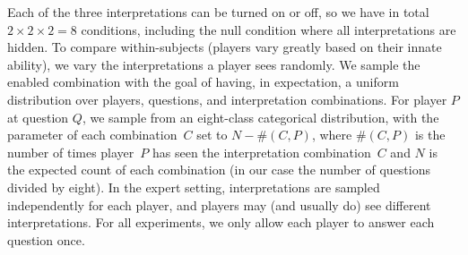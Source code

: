 Each of the three interpretations can be turned on or off, so we have
in total $2\times2\times2=8$ conditions, including the null condition
where all interpretations are hidden.
To compare within-subjects (players vary greatly based on their innate
ability), we vary the interpretations a player sees randomly.  We
sample the enabled combination with the goal of having, in
expectation, a uniform distribution over players, questions, and
interpretation combinations. For player $P$ at question $Q$, we sample
from an eight-class categorical distribution, with the parameter of
each combination~$C$ set to $N-\#(C, P)$, where $\#(C, P)$ is the
number of times player~$P$ has seen the interpretation combination~$C$
and $N$ is the expected count of each combination (in our case 
the number of questions divided by eight).  In the expert setting,
interpretations are sampled independently for each player, and players
may (and usually do) see different interpretations.
For all experiments, we only allow each player to answer each question
once.

